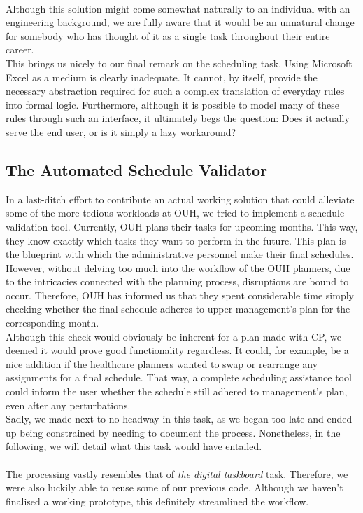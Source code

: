 \\
Although this solution might come somewhat naturally to an individual with an engineering background, we are fully aware that it would be an unnatural change for somebody who has thought of it as a single task throughout their entire career.
\\
This brings us nicely to our final remark on the scheduling task. Using Microsoft Excel as a medium is clearly inadequate. It cannot, by itself, provide the necessary abstraction required for such a complex translation of everyday rules into formal logic. Furthermore, although it is possible to model many of these rules through such an interface, it ultimately begs the question: Does it actually serve the end user, or is it simply a lazy workaround?

\subsection{The Automated Schedule Validator}
In a last-ditch effort to contribute an actual working solution that could alleviate some of the more tedious workloads at OUH, we tried to implement a schedule validation tool. Currently, OUH plans their tasks for upcoming months. This way, they know exactly which tasks they want to perform in the future. This plan is the blueprint with which the administrative personnel make their final schedules. However, without delving too much into the workflow of the OUH planners, due to the intricacies connected with the planning process, disruptions are bound to occur. Therefore, OUH has informed us that they spent considerable time simply checking whether the final schedule adheres to upper management's plan for the corresponding month. 
\\
Although this check would obviously be inherent for a plan made with CP, we deemed it would prove good functionality regardless. It could, for example, be a nice addition if the healthcare planners wanted to swap or rearrange any assignments for a final schedule. That way, a complete scheduling assistance tool could inform the user whether the schedule still adhered to management's plan, even after any perturbations.
\\
Sadly, we made next to no headway in this task, as we began too late and ended up being constrained by needing to document the process. Nonetheless, in the following, we will detail what this task would have entailed. 
\\
\\
The processing vastly resembles that of \emph{the digital taskboard} task. Therefore, we were also luckily able to reuse some of our previous code. Although we haven't finalised a working prototype, this definitely streamlined the workflow. 
